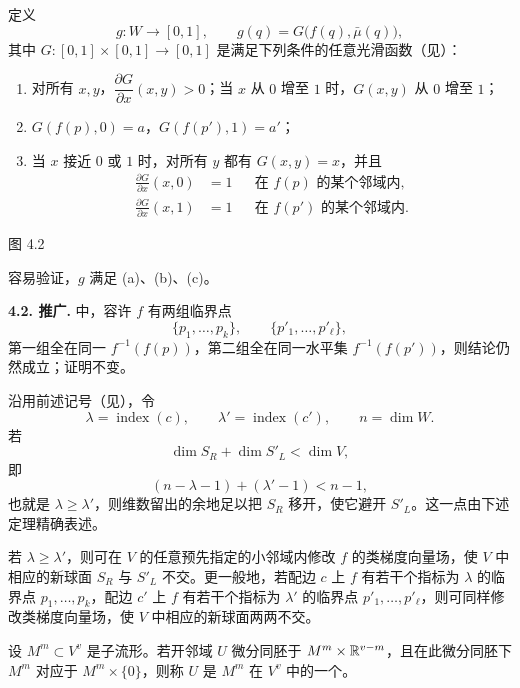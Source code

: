 定义
\[
  g:W\longrightarrow[0,1],
  \qquad
  g(q)=G\bigl(f(q),\bar\mu(q)\bigr),
\]
其中 $G:[0,1]\times[0,1]\to[0,1]$ 是满足下列条件的任意光滑函数（见）：
\begin{enumerate}[label=(\roman*)]
  \item 对所有 $x,y$，$\dfrac{\partial G}{\partial x}(x,y)>0$；当 $x$ 从 $0$ 增至 $1$ 时，$G(x,y)$ 从 $0$ 增至 $1$；
  \item $G(f(p),0)=a$，$G(f(p'),1)=a'$；
  \item 当 $x$ 接近 $0$ 或 $1$ 时，对所有 $y$ 都有 $G(x,y)=x$，并且
  \begin{align*}
    \frac{\partial G}{\partial x}(x,0)&=1
      &&\text{在 $f(p)$ 的某个邻域内},\\
    \frac{\partial G}{\partial x}(x,1)&=1
      &&\text{在 $f(p')$ 的某个邻域内}.
  \end{align*}
\end{enumerate}

\begin{center}
  \FigFourTwo

  \label{fig:4.2}图 4.2
\end{center}

容易验证，$g$ 满足 (a)、(b)、(c)。
\EndProof

\par\medskip\noindent{}\label{stmt:4.2}\textbf{4.2. 推广.}\quad
{} 中，容许 $f$ 有两组临界点
\[
  \{p_1,\ldots,p_k\},
  \qquad
  \{p'_1,\ldots,p'_\ell\},
\]
第一组全在同一 $f^{-1}(f(p))$，第二组全在同一水平集 $f^{-1}(f(p'))$，则结论仍然成立；证明不变。

沿用前述记号（见），令
\[
  \lambda=\operatorname{index}(c),
  \qquad
  \lambda'=\operatorname{index}(c'),
  \qquad
  n=\dim W.
\]
若
\[
  \dim S_R+\dim S'_L<\dim V,
\]
即
\[
  (n-\lambda-1)+(\lambda'-1)<n-1,
\]
也就是 $\lambda\geq\lambda'$，则维数留出的余地足以把 $S_R$ 移开，使它避开 $S'_L$。这一点由下述定理精确表述。

若 $\lambda\geq\lambda'$，则可在 $V$ 的任意预先指定的小邻域内修改 $f$ 的类梯度向量场，使 $V$ 中相应的新球面 $S_R$ 与 $S'_L$ 不交。更一般地，若配边 $c$ 上 $f$ 有若干个指标为 $\lambda$ 的临界点 $p_1,\ldots,p_k$，配边 $c'$ 上 $f$ 有若干个指标为 $\lambda'$ 的临界点 $p'_1,\ldots,p'_\ell$，则可同样修改类梯度向量场，使 $V$ 中相应的新球面两两不交。

设 $M^m\subset V^v$ 是子流形。若开邻域 $U$ 微分同胚于 $M^m\times\mathbb{R}^{v-m}$，且在此微分同胚下 $M^m$ 对应于 $M^m\times\{0\}$，则称 $U$ 是 $M^m$ 在 $V^v$ 中的一个\emph{}。

